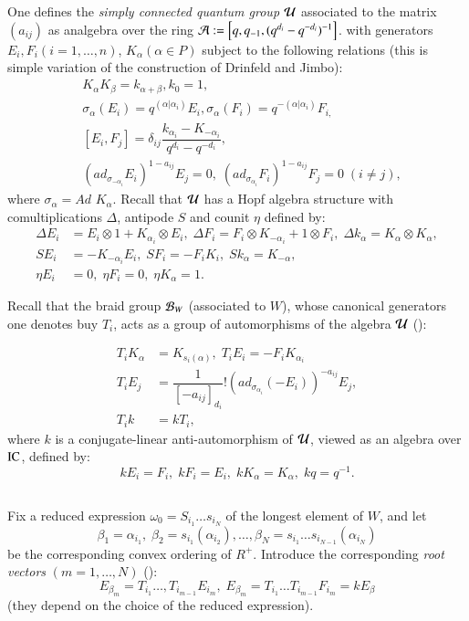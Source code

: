 One defines the \textit{simply connected quantum group} $\mathcal{U}$ associated to the matrix $(a_{ij})$ as analgebra over the ring $\mathcal{A}:= \left[q, q_{-1}, (q^{d_{i}}-q^{-d_{i}})^{-1}\right]$. with generators $E_{i}, F_{i}(i = 1, \ldots, n)$, $K_{\alpha}(\alpha \in P)$ subject to the following relations (this is simple variation of the construction of Drinfeld and Jimbo): 
\begin{align*}
 &K_{\alpha}K_{\beta} = k_{\alpha+\beta}, k_{0}=1,\\
&\sigma_{\alpha}(E_{i}) = q^{(\alpha | \alpha_{i})}E_{i}, \sigma_{\alpha}(F_{i}) = q^{-(\alpha | \alpha_{i})}F_{i,}\\
&[E_{i}, F_{j}] = \delta_{ij}\dfrac{k_{\alpha_{i}}-K_{-\alpha_{i}}}{q^{d_{i}}-q^{-d_{i}}},\\
&(ad_{\sigma_{-\alpha_{i}}}E_{i})^{1-a_{ij}}E_{j} = 0, \; (ad_{\sigma_{\alpha_{i}}}F_{i})^{1-a_{ij}}F_{j} = 0\; (i \neq j),
\end{align*}
where $\sigma_{\alpha} = Ad$ $K_{\alpha}$. Recall that $\mathcal{U}$ has a Hopf algebra structure with comultiplications $\Delta$, antipode $S$ and counit $\eta$ defined by: 
\begin{align*}
\Delta E_{i} &= E_{i}\otimes 1 + K_{\alpha_{i}} \otimes E_{i}, \; \Delta F_{i} = F_{i}\otimes K_{-\alpha_{i}} + 1 \otimes F_{i},\; \Delta k_{\alpha} = K_{\alpha}\otimes K_{\alpha},\\
SE_{i}& = -K_{-\alpha_{i}}E_{i}, \; SF_{i} =-F_{i}K_{i}, \; Sk_{\alpha} = K_{-\alpha},\\
\eta E_{i} &= 0, \; \eta F_{i} = 0,\; \eta K_{\alpha} = 1. 
\end{align*}

 Recall that the braid group $\mathcal{B}_{W}$ (associated to $W$), whose canonical generators one denotes buy $T_{i}$, acts as a group of automorphisms of the algebra $\mathcal{U}$ (\cite{chap4-keyL}):

\begin{align*}
T_{i}K_{\alpha} &= K_{s_{i}(\alpha)}, \; T_{i}E_{i} = -F_{i}K_{\alpha_{i}}\\
T_{i}E_{j} &= \dfrac{1}{[-a_{ij}]_{d_{i}}}! (ad_{\sigma_{\alpha_{i}}}(-E_{i}))^{-a_{ij}}E_{j},\\
 T_{i}k &= kT_{i},
\end{align*}
where $k$ is a conjugate-linear anti-automorphism of $\mathcal{U}$, viewed as an algebra over $\operatorname{IC}$, defined by:
$$
kE_{i} =F_{i}, \; kF_{i}=E_{i},\; kK_{\alpha} = K_{\alpha}, \; kq =q^{-1}.
$$

\subsection{}\label{chap4-subsec-2.2}
Fix a reduced expression $\omega_{0} = S_{i_{1}}\ldots s_{i_{N}}$ of the longest element of $W$, and let
$$
\beta_{1} =\alpha_{i_{1}},\; \beta_{2} =s_{i_{1}}(\alpha_{i_{2}}), \ldots, \beta_{N} = s_{i_{1}} \ldots s_{i_{N-1}}(\alpha_{i_{N}}) 
$$\pageoriginale
be the corresponding convex ordering of $R^{+}$. Introduce the corresponding \textit{root vectors} $(m=1,\ldots, N)$ (\cite{chap4-keyL}):
$$
E_{\beta_{m}} = T_{i_{1}}\ldots, T_{i_{m-1}}E_{i_{m}}, \; E_{\beta_{m}} = T_{i_{1}}\ldots T_{i_{m-1}}F_{i_{m}} = kE_{\beta}
$$
(they depend on the choice of the reduced expression).

